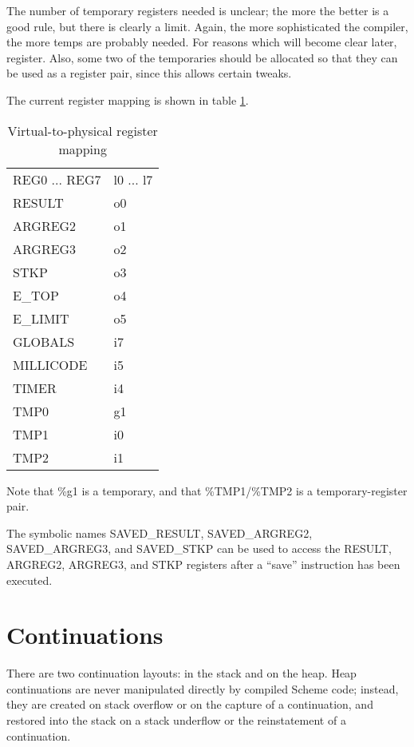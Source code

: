 The number of temporary registers needed is unclear; the more the
better is a good rule, but there is clearly a limit. Again, the more
sophisticated the compiler, the more temps are probably needed. For
reasons which will become clear later, %
register. Also, some two of the temporaries should be allocated so
that they can be used as a register pair, since this allows certain
tweaks.

The current register mapping is shown in table \ref{mappings}.

\begin{table}[hbt]
\begin{center}
\begin{tabular}{|l|l|} \hline
   REG0 ... REG7 &  l0 ... l7  \\
   RESULT        &  o0 \\
   ARGREG2       &  o1 \\
   ARGREG3       &  o2 \\
   STKP          &  o3 \\
   E\_TOP         &  o4 \\
   E\_LIMIT       &  o5 \\
   GLOBALS       &  i7 \\
   MILLICODE     &  i5 \\
   TIMER         &  i4 \\
   TMP0          &  g1 \\
   TMP1          &  i0 \\
   TMP2          &  i1 \\ \hline
\end{tabular}
\end{center}
\caption{Virtual-to-physical register mapping}
\label{mappings}
\end{table}

Note that \%g1 is a temporary, and that \%TMP1/\%TMP2 is a temporary-register
pair.

The symbolic names SAVED\_RESULT, SAVED\_ARGREG2, SAVED\_ARGREG3, and
SAVED\_STKP can be used to access the RESULT, ARGREG2, ARGREG3, and
STKP registers after a ``save'' instruction has been executed.


\section{Continuations}

There are two continuation layouts: in the stack and on the heap. Heap
continuations are never manipulated directly by compiled Scheme code;
instead, they are created on stack overflow or on the capture of a
continuation, and restored into the stack on a stack underflow or the
reinstatement of a continuation.

